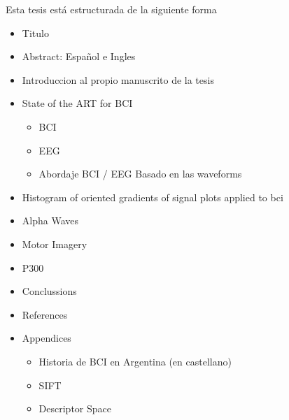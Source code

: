 \documentclass[11pt,twoside,openright]{moddalthesis}
\theoremstyle{definition}
\begin{document}
Esta tesis está estructurada de la siguiente forma

\begin{itemize}
\item Titulo
\item Abstract: Español e Ingles
\item Introduccion al propio manuscrito de la tesis
\item State of the ART for BCI
\begin{itemize}
\item BCI
\item EEG
\item Abordaje BCI / EEG Basado en las waveforms
\end{itemize}
\item Histogram of oriented gradients of signal plots applied to bci
\item Alpha Waves
\item Motor Imagery
\item P300
\item Conclussions
\item References
\item Appendices
\begin{itemize}
\item Historia de BCI en Argentina (en castellano)
\item SIFT
\item Descriptor Space
\end{itemize}
\end{itemize}











%

\appendix
\cleardoublepage







\linespread{1.44}



%  
\end{document}
